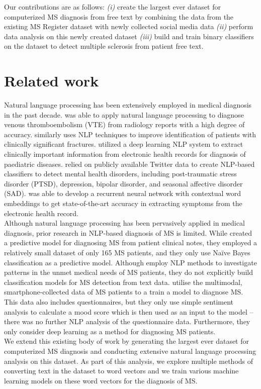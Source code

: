 \documentclass[11pt,a4paper]{article}
\begin{document}
\indent Our contributions are as follows: \emph{(i)} create the largest ever dataset for computerized MS diagnosis from free text by combining the data from the existing MS Register dataset with newly collected social media data \emph{(ii)} perform data analysis on this newly created dataset \emph{(iii)} build and train binary classifiers on the dataset to detect multiple sclerosis from patient free text.
\section{Related work}
Natural language processing has been extensively employed in medical diagnosis in the past decade. \citet{Swartz:17} was able to apply natural language processing to diagnose venous thromboembolism (VTE) from radiology reports with a high degree of accuracy.
\citet{Kolanu:20} similarly uses NLP techniques to improve identification of patients with clinically significant fractures. \citet{Liang:19} utilized a deep learning NLP system to extract clinically important information from electronic health records for diagnosis of paediatric diseases. \citet{Coppersmith:14} relied on publicly available Twitter data to create NLP-based classifiers to detect mental health disorders, including post-traumatic stress disorder (PTSD), depression, bipolar disorder, and seasonal affective disorder (SAD). \citet{Yang:19} was able to develop a recurrent neural network with contextual word embeddings to get state-of-the-art accuracy in extracting symptoms from the electronic health record. \\
\indent Although natural language processing has been pervasively applied in medical diagnosis, prior research in NLP-based diagnosis of MS is limited. While \citet{Chase:17} created a predictive model for diagnosing MS from patient clinical notes, they employed a relatively small dataset of only 165 MS patients, and they only use Naïve Bayes classification as a predictive model. Although \citet{Koss;Joschko:22} employ NLP methods to investigate patterns in the unmet medical needs of MS patients, they do not explicitly build classification models for MS detection from text data. \citet{Schwab;Karlen:21} utilise the multimodal, smartphone-collected data of MS patients to a train a model to diagnose MS. This data also includes questionnaires, but they only use simple sentiment analysis to calculate a mood score which is then used as an input to the model – there was no further NLP analysis of the questionnaire data. Furthermore, they only consider deep learning as a method for diagnosing MS patients. \\
\indent We extend this existing body of work by generating the largest ever dataset for computerized MS diagnosis and conducting extensive natural language processing analysis on this dataset. As part of this analysis, we explore multiple methods of converting text in the dataset to word vectors and we train various machine learning models on these word vectors for the diagnosis of MS. 
\end{document}
